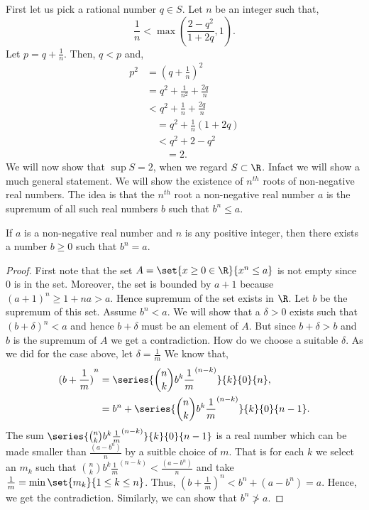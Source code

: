 First let us pick a rational number $q \in S$. Let $n$ be an integer such that,
\[\frac{1}{n} < \max{(\frac{2-q^2}{1+2q},1)}.\]
Let $p = q + \frac{1}{n}$. Then, $q < p$ and,
\begin{align*}
    p^2 &= {(q + \frac{1}{n})}^2 \\
    & = q^2 + \frac{1}{n^2} + \frac{2q}{n}\\
    & < q^2 + \frac{1}{n} + \frac{2q}{n} \\
    &\quad = q^2 + \frac{1}{n}(1 + 2q)\\ 
    &\quad < q^2 + 2 - q^2\\
    &\quad\quad = 2.
\end{align*}
We will now show that $\sup{S} = 2$, when we regard $S \subset \R$. Infact we will show a much general
statement. We will show the existence of $n^{th}$ roots of non-negative real numbers. The idea is that the
$n^{th}$ root a non-negative real number $a$ is the supremum of all such real numbers $b$ such that 
$b^n \leq a$.
\begin{Theorem}
    If $a$ is a non-negative real number and $n$ is any positive integer, then there exists a number $b \geq
    0$ such that $b^n = a$.
\end{Theorem}
\begin{proof}
    First note that the set $A = \set{x \geq 0 \in \R}{x^n \leq a}$ is not empty since $0$ is in the set.
    Moreover, the set is bounded by $a+1$ because ${(a+1)}^n \geq 1 + na > a$. Hence supremum of the set exists
    in $\R$. Let $b$ be the supremum of this set. 
    Assume $b^n < a$. We will show that a $\delta > 0$ exists such that ${(b + \delta)}^n < a$ and hence $b + 
    \delta$ must be an element of $A$. But since $b + \delta > b$ and $b$ is the supremum of $A$ we get a
    contradiction.
    How do we choose a suitable $\delta$. As we did for the case above, let $\delta = \frac{1}{m}$
    We know that,
    \begin{align*}
	{(b + \frac{1}{m})}^n &= \series{\binom{n}{k}b^{k}{\frac{1}{m}}^{(n-k)}}{k}{0}{n},\\
	&= b^n + \series{\binom{n}{k}b^{k}{\frac{1}{m}}^{(n-k)}}{k}{0}{n-1}.\\
    \end{align*}
    The sum $\series{\binom{n}{k}b^{k}{\frac{1}{m}}^{(n-k)}}{k}{0}{n-1}$ is a real number which can be made
    smaller than $\frac{(a - b^n)}{n}$ by a suitble choice of $m$. That is for each $k$ we select an $m_k$
    such that $\binom{n}{k}b^k {\frac{1}{m}}^{(n-k)} < \frac{(a - b^n)}{n}$ and take $\frac{1}{m} =
    \min\set{m_k}{1\leq k \leq n}$.
    Thus,
    ${(b + \frac{1}{m})}^n < b^n + (a - b^n) = a$. Hence, we get the contradiction. Similarly, we can show
    that $b^n \not > a$.
\end{proof}
